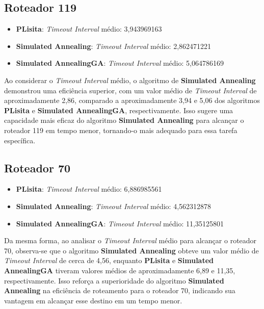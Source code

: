 \documentclass[conference]{IEEEtran}
\begin{document}
\subsection{Roteador 119}

\begin{itemize}
    \item \textbf{PLisita}: \textit{Timeout Interval} médio: 3,943969163
    \item \textbf{Simulated Annealing}: \textit{Timeout Interval} médio: 2,862471221
    \item \textbf{Simulated AnnealingGA}: \textit{Timeout Interval} médio: 5,064786169
\end{itemize}

Ao considerar o \textit{Timeout Interval} médio, o algoritmo de \textbf{Simulated Annealing} demonstrou uma eficiência superior, com um valor médio de \textit{Timeout Interval} de aproximadamente 2,86, comparado a aproximadamente 3,94 e 5,06 dos algoritmos \textbf{PLisita} e \textbf{Simulated AnnealingGA}, respectivamente. Isso sugere uma capacidade mais eficaz do algoritmo \textbf{Simulated Annealing} para alcançar o roteador 119 em tempo menor, tornando-o mais adequado para essa tarefa específica.

\subsection{Roteador 70}

\begin{itemize}
    \item \textbf{PLisita}: \textit{Timeout Interval} médio: 6,886985561
    \item \textbf{Simulated Annealing}: \textit{Timeout Interval} médio: 4,562312878
    \item \textbf{Simulated AnnealingGA}: \textit{Timeout Interval} médio: 11,35125801
\end{itemize}

Da mesma forma, ao analisar o \textit{Timeout Interval} médio para alcançar o roteador 70, observa-se que o algoritmo \textbf{Simulated Annealing} obteve um valor médio de \textit{Timeout Interval} de cerca de 4,56, enquanto \textbf{PLisita} e \textbf{Simulated AnnealingGA} tiveram valores médios de aproximadamente 6,89 e 11,35, respectivamente. Isso reforça a superioridade do algoritmo \textbf{Simulated Annealing} na eficiência de roteamento para o roteador 70, indicando sua vantagem em alcançar esse destino em um tempo menor.
\end{document}
